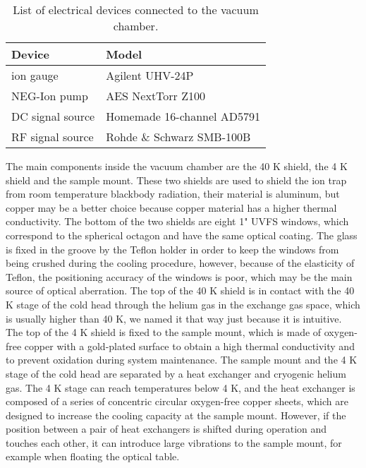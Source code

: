 \begin{table}
    \centering
    \caption{List of electrical devices connected to the vacuum chamber.}
    \begin{tabular}{ll}
        \toprule
        Device           & Model                      \\
        \midrule
        ion gauge        & Agilent UHV-24P            \\
        NEG-Ion pump     & AES NextTorr Z100          \\
        DC signal source & Homemade 16-channel AD5791 \\
        RF signal source & Rohde \& Schwarz SMB-100B  \\
        \bottomrule
    \end{tabular}
\end{table}

The main components inside the vacuum chamber are the 40 K shield, the 4 K shield and the sample mount. These two shields are used to shield the ion trap from room temperature blackbody radiation, their material is aluminum, but copper may be a better choice because copper material has a higher thermal conductivity. The bottom of the two shields are eight 1" UVFS windows, which correspond to the spherical octagon and have the same optical coating. The glass is fixed in the groove by the Teflon holder in order to keep the windows from being crushed during the cooling procedure, however, because of the elasticity of Teflon, the positioning accuracy of the windows is poor, which may be the main source of optical aberration. The top of the 40 K shield is in contact with the 40 K stage of the cold head through the helium gas in the exchange gas space, which is usually higher than 40 K, we named it that way just because it is intuitive. The top of the 4 K shield is fixed to the sample mount, which is made of oxygen-free copper with a gold-plated surface to obtain a high thermal conductivity and to prevent oxidation during system maintenance. The sample mount and the 4 K stage of the cold head are separated by a heat exchanger and cryogenic helium gas. The 4 K stage can reach temperatures below 4 K, and the heat exchanger is composed of a series of concentric circular oxygen-free copper sheets, which are designed to increase the cooling capacity at the sample mount. However, if the position between a pair of heat exchangers is shifted during operation and touches each other, it can introduce large vibrations to the sample mount, for example when floating the optical table.

